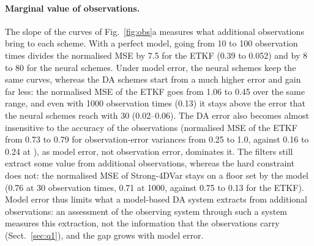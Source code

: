 \paragraph{Marginal value of observations.}
The slope of the curves of Fig.~\ref{fig:obs}a measures what additional observations
bring to each scheme. With a perfect model, going from 10 to 100 observation times divides the
normalised MSE by 7.5 for the ETKF (0.39 to 0.052) and by 8 to 80 for the neural schemes. Under
model error, the neural schemes keep the same curves, whereas the DA schemes start from a much
higher error and gain far less: the normalised MSE of the ETKF goes from 1.06 to 0.45 over the same
range, and even with 1000 observation times (0.13) it stays above the error that the neural schemes
reach with 30 (0.02--0.06). The DA error also becomes almost insensitive to the accuracy of the
observations (normalised MSE of the ETKF from 0.73 to 0.79 for observation-error variances from 0.25
to 1.0, against 0.16 to 0.24 at \Sz), as model error, not observation error, dominates it. The filters
still extract some value from additional observations, whereas the hard constraint does
not: the normalised MSE of Strong-4DVar stays on a floor set by the model (0.76 at 30 observation
times, 0.71 at 1000, against 0.75 to 0.13 for the ETKF). Model error
thus limits what a model-based DA system extracts from additional observations: an assessment
of the observing system through such a system measures this extraction, not the information
that the observations carry (Sect.~\ref{sec:q1}), and the gap grows with model error.

